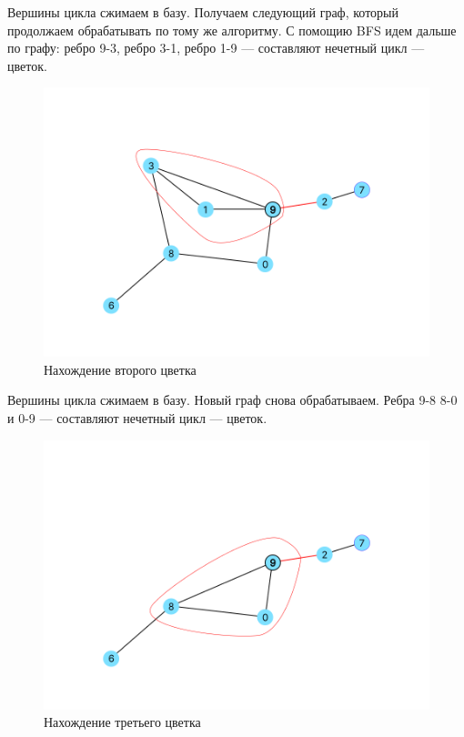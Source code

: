 \documentclass[14pt, a4paper]{extarticle}
\begin{document}
    
    Вершины цикла сжимаем в базу. Получаем следующий граф, который продолжаем обрабатывать по тому же алгоритму.
    С помощию BFS идем дальше по графу:
    ребро 9-3, ребро 3-1, ребро 1-9 --- составляют нечетный цикл --- цветок.

    \begin{figure}[h!]
        \centering
        \includegraphics[scale=0.3]{3.png}
        \caption{Нахождение второго цветка}
        \label{fig:my_label}
    \end{figure} 

    \pagebreak

    Вершины цикла сжимаем в базу. Новый  граф снова обрабатываем.
    Ребра 9-8 8-0 и 0-9 --- составляют нечетный цикл --- цветок.

    \begin{figure}[h!]
        \centering
        \includegraphics[scale=0.3]{4.png}
        \caption{Нахождение третьего цветка}
        \label{fig:my_label}
    \end{figure} 
\end{document}
